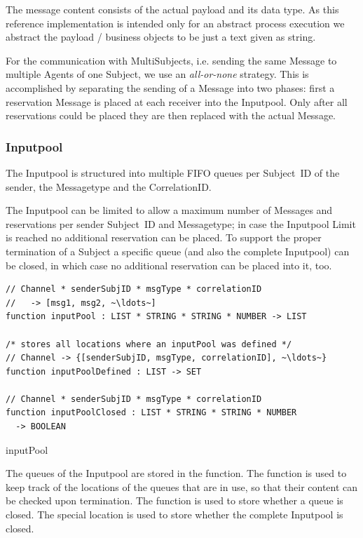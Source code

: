 The message content consists of the actual payload and its data type. As this
reference implementation is intended only for an abstract process execution we abstract
the payload / business objects to be just a text given as string.

For the communication with MultiSubjects, i.e. sending the same Message to
multiple Agents of one Subject, we use an \textit{all-or-none} strategy. This
is accomplished by separating the sending of a Message into two phases: first
a reservation Message is placed at each receiver into the Inputpool.
Only after all reservations could be placed they are then replaced with the
actual Message.

\subsubsection{Inputpool}\label{sec:Inputpool}

The Inputpool is structured into multiple FIFO queues per Subject~ID of the sender, the Messagetype and the CorrelationID.

The Inputpool can be limited to allow a maximum number of Messages and
reservations per sender Subject~ID and Messagetype; in case the Inputpool Limit is
reached no additional reservation can be placed. To support the proper
termination of a Subject a specific queue (and also the complete Inputpool)
can be closed, in which case no additional reservation can be placed into it,
too.

\begin{listing}[htbp]
\begin{verbatim}
// Channel * senderSubjID * msgType * correlationID
//   -> [msg1, msg2, ~\ldots~]
function inputPool : LIST * STRING * STRING * NUMBER -> LIST

/* stores all locations where an inputPool was defined */
// Channel -> {[senderSubjID, msgType, correlationID], ~\ldots~}
function inputPoolDefined : LIST -> SET

// Channel * senderSubjID * msgType * correlationID
function inputPoolClosed : LIST * STRING * STRING * NUMBER
  -> BOOLEAN
\end{verbatim}
\caption{inputPool}
\label{lst:shortasm:inputPool}
\end{listing}


The queues of the Inputpool are stored in the  function.
The function  is used to keep track of the
locations of the queues that are in use, so that their content can be checked
upon termination. The function  is used to store
whether a queue is closed. The special location
 is used to
store whether the complete Inputpool is closed.

